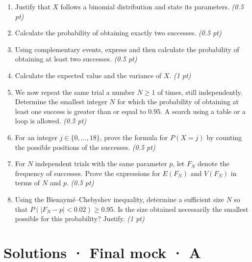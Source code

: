 \begin{enumerate}

\item Justify that $X$ follows a binomial distribution and state its parameters. \hfill\textit{(0.5 pt)}

\item Calculate the probability of obtaining exactly two successes. \hfill\textit{(0.5 pt)}

\item Using complementary events, express and then calculate the probability of obtaining at least two successes. \hfill\textit{(0.5 pt)}

\item Calculate the expected value and the variance of $X$. \hfill\textit{(1 pt)}

\item We now repeat the same trial a number $N\ge1$ of times, still independently. Determine the smallest integer $N$ for which the probability of obtaining at least one success is greater than or equal to $\num{0,95}$. A search using a table or a loop is allowed. \hfill\textit{(0.5 pt)}

\item For an integer $j\in\{0,\ldots,18\}$, prove the formula for $P(X=j)$ by counting the possible positions of the successes. \hfill\textit{(0.5 pt)}

\item For $N$ independent trials with the same parameter $p$, let $F_N$ denote the frequency of successes. Prove the expressions for $E(F_N)$ and $V(F_N)$ in terms of $N$ and $p$. \hfill\textit{(0.5 pt)}

\item Using the Bienaymé–Chebyshev inequality, determine a sufficient size $N$ so that $P(|F_N-p|<\num{0,02})\ge\num{0,95}$. Is the size obtained necessarily the smallest possible for this probability? Justify. \hfill\textit{(1 pt)}

\end{enumerate}

\ifmxteacher\mxnewpage

\section*{Solutions · Final mock · A}\label{cor:9-3}


